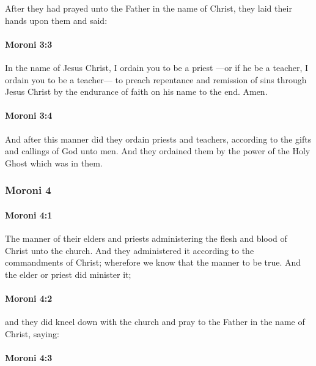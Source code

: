 			After they had prayed unto the Father in the name of Christ,
			they laid their hands upon them and said:

		\paragraph{Moroni 3:3} %
			\label{MORONI-3-3}

			In the name of Jesus Christ,
			I ordain you to be a priest
			---or if he be a teacher,
			I ordain you to be a teacher---
			to preach repentance and remission of sins through Jesus Christ
			by the endurance of faith on his name to the end.
			Amen.

		\paragraph{Moroni 3:4} %
			\label{MORONI-3-4}

			And after this manner did they ordain priests and teachers,
			according to the gifts and callings of God unto men.
			And they ordained them by the power of the Holy Ghost which was in them.

	\subsubsection{Moroni 4} %
		\label{MORONI-4}
		
		\paragraph{Moroni 4:1} %
			\label{MORONI-4-1}

			The manner of their elders and priests administering
			the flesh and blood of Christ unto the church.
			And they administered it according to the commandments of Christ;
			wherefore we know that the manner to be true.
			And the elder or priest did minister it;

		\paragraph{Moroni 4:2} %
			\label{MORONI-4-2}

			and they did kneel down with the church
			and pray to the Father in the name of Christ, saying:

		\paragraph{Moroni 4:3} %
			\label{MORONI-4-3}

